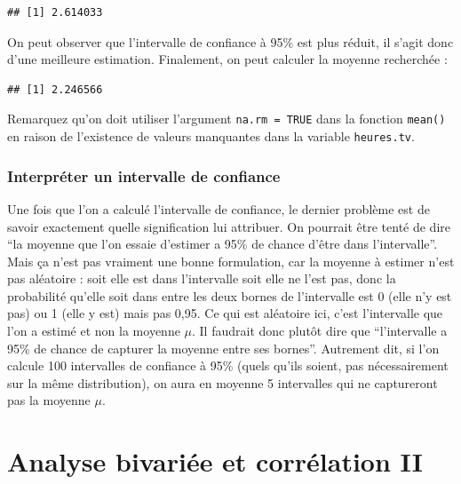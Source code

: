 \documentclass[
]{book}
\newenvironment{Shaded}{\begin{snugshade}}{\end{snugshade}}
\newcommand{\AttributeTok}[1]{\textcolor[rgb]{0.77,0.63,0.00}{#1}}
\newcommand{\ConstantTok}[1]{\textcolor[rgb]{0.00,0.00,0.00}{#1}}
\newcommand{\FunctionTok}[1]{\textcolor[rgb]{0.00,0.00,0.00}{#1}}
\newcommand{\NormalTok}[1]{#1}
\newcommand{\SpecialCharTok}[1]{\textcolor[rgb]{0.00,0.00,0.00}{#1}}
\begin{document}
\begin{verbatim}
## [1] 2.614033
\end{verbatim}

On peut observer que l'intervalle de confiance à 95\% est plus réduit, il s'agit donc d'une meilleure estimation. Finalement, on peut calculer la moyenne recherchée :

\begin{Shaded}
\end{Shaded}

\begin{verbatim}
## [1] 2.246566
\end{verbatim}

Remarquez qu'on doit utiliser l'argument \texttt{na.rm\ =\ TRUE} dans la fonction \texttt{mean()} en raison de l'existence de valeurs manquantes dans la variable \texttt{heures.tv}.

\hypertarget{interpruxe9ter-un-intervalle-de-confiance}{%
\subsection{Interpréter un intervalle de confiance}\label{interpruxe9ter-un-intervalle-de-confiance}}

Une fois que l'on a calculé l'intervalle de confiance, le dernier problème est de savoir exactement quelle signification lui attribuer. On pourrait être tenté de dire ``la moyenne que l'on essaie d'estimer a 95\% de chance d'être dans l'intervalle''. Mais ça n'est pas vraiment une bonne formulation, car la moyenne à estimer n'est pas aléatoire : soit elle est dans l'intervalle soit elle ne l'est pas, donc la probabilité qu'elle soit dans entre les deux bornes de l'intervalle est 0 (elle n'y est pas) ou 1 (elle y est) mais pas 0,95. Ce qui est aléatoire ici, c'est l'intervalle que l'on a estimé et non la moyenne \(\mu\). Il faudrait donc plutôt dire que ``l'intervalle a 95\% de chance de capturer la moyenne entre ses bornes''. Autrement dit, si l'on calcule 100 intervalles de confiance à 95\% (quels qu'ils soient, pas nécessairement sur la même distribution), on aura en moyenne 5 intervalles qui ne captureront pas la moyenne \(\mu\).

\hypertarget{analyse-bivariuxe9e-et-corruxe9lation-ii}{%
\chapter{Analyse bivariée et corrélation II}\label{analyse-bivariuxe9e-et-corruxe9lation-ii}}
\end{document}
